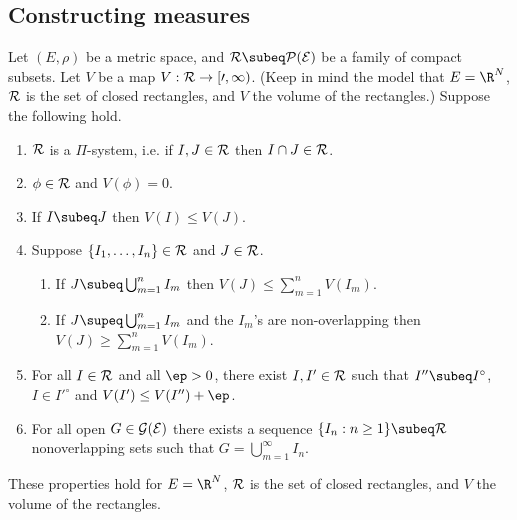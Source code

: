 
\subsection{Constructing measures}
Let $(E,\rho)$ be a metric space, and $\cal R\subeq \cal P(E)$ be a family of compact subsets. Let $V$ be a map $V:\cal R\to [0,\infty)$. (Keep in mind the model that $E=\R^N$, $\cal R$ is the set of closed rectangles, and $V$ the volume of the rectangles.)
Suppose the following hold.
\begin{enumerate}
\item 
$\cal R$ is a $\Pi$-system, i.e. if $I,J\in \cal R$ then $I\cap J\in \cal R$.
\item
$\phi\in \cal R$ and $V(\phi)=0$.
\item
If $I\subeq J$ then $V(I)\leq V(J)$. 
\item
Suppose $\{I_1,\ldots, I_n\}\in \cal R$ and $J\in \cal R$.
\begin{enumerate}
\item
If $J\subeq \bigcup_{m=1}^n I_m$ then $V(J)\leq \sum_{m=1}^n V(I_m)$.
\item 
If $J\supeq \bigcup_{m=1}^n I_m$ and the $I_m$'s are non-overlapping then $V(J)\geq \sum_{m=1}^n V(I_m)$.
\end{enumerate}
\item For all $I\in \cal R$ and all $\ep>0$, there exist $I,I'\in \cal R$ such that $I''\subeq I^{\circ}$, $I\in I'^{\circ}$ and $V(I')\leq V(I'')+\ep$.
\item For all open $G\in \cal G(E)$ there exists a sequence $\{I_n:n\geq 1\}\subeq \cal R$ nonoverlapping sets such that $G=\bigcup_{m=1}^{\infty} I_n$.
\end{enumerate}
\begin{pr}\label{rectyum}
These properties hold for $E=\R^N$, $\cal R$ is the set of closed rectangles, and $V$ the volume of the rectangles.
\end{pr}
